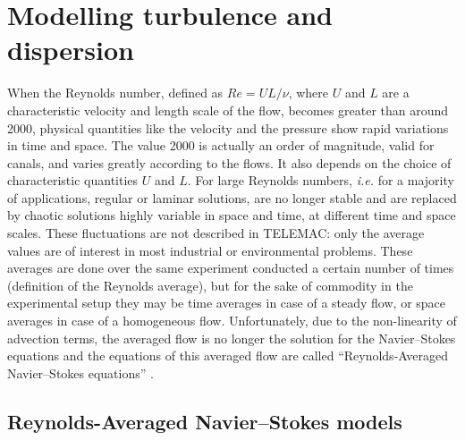 \section{\label{turbulence}Modelling turbulence and dispersion%
}
When the Reynolds number, defined as $Re=UL/\nu$, where $U$ and $L$ are a characteristic velocity
and length scale of the flow, becomes greater than around 2000, physical quantities
like the velocity and the pressure show rapid variations in time and space. The value
2000 is actually an order of magnitude, valid for canals, and varies greatly
according to the flows. It also depends on the choice of characteristic quantities
$U$ and $L$. For large Reynolds numbers, \textit{i.e.} for a majority of applications,
regular or laminar solutions, are no longer stable and are replaced by chaotic
solutions highly variable in space and time, at different time and space scales.
These fluctuations are not described in TELEMAC: only the average values are of interest in most
industrial or environmental problems.
These averages are done over the same experiment conducted a certain number of times (definition of the Reynolds average),
but for the sake of commodity in the experimental setup they may be time averages in case of a steady flow, or space averages
in case of a homogeneous flow.
Unfortunately, due to the non-linearity of advection terms, the averaged flow is no longer the solution
for the Navier--Stokes equations and the equations of this averaged flow are
called \textquotedblleft Reynolds-Averaged Navier--Stokes equations\textquotedblright%
.

\subsection{Reynolds-Averaged Navier--Stokes models}\label{sec:RANS}

